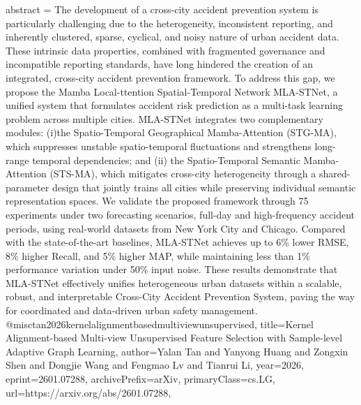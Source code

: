 {      abstract = {The development of a cross-city accident prevention system is particularly challenging due to the heterogeneity, inconsistent reporting, and inherently clustered, sparse, cyclical, and noisy nature of urban accident data. These intrinsic data properties, combined with fragmented governance and incompatible reporting standards, have long hindered the creation of an integrated, cross-city accident prevention framework. To address this gap, we propose the Mamba Local-ttention Spatial-Temporal Network MLA-STNet, a unified system that formulates accident risk prediction as a multi-task learning problem across multiple cities. MLA-STNet integrates two complementary modules: (i)the Spatio-Temporal Geographical Mamba-Attention (STG-MA), which suppresses unstable spatio-temporal fluctuations and strengthens long-range temporal dependencies; and (ii) the Spatio-Temporal Semantic Mamba-Attention (STS-MA), which mitigates cross-city heterogeneity through a shared-parameter design that jointly trains all cities while preserving individual semantic representation spaces. We validate the proposed framework through 75 experiments under two forecasting scenarios, full-day and high-frequency accident periods, using real-world datasets from New York City and Chicago. Compared with the state-of-the-art baselines, MLA-STNet achieves up to 6\% lower RMSE, 8\% higher Recall, and 5\% higher MAP, while maintaining less than 1\% performance variation under 50\% input noise. These results demonstrate that MLA-STNet effectively unifies heterogeneous urban datasets within a scalable, robust, and interpretable Cross-City Accident Prevention System, paving the way for coordinated and data-driven urban safety management.}
}@misc{tan2026kernelalignmentbasedmultiviewunsupervised,
      title={Kernel Alignment-based Multi-view Unsupervised Feature Selection with Sample-level Adaptive Graph Learning}, 
      author={Yalan Tan and Yanyong Huang and Zongxin Shen and Dongjie Wang and Fengmao Lv and Tianrui Li},
      year={2026},
      eprint={2601.07288},
      archivePrefix={arXiv},
      primaryClass={cs.LG},
      url={https://arxiv.org/abs/2601.07288},
}
